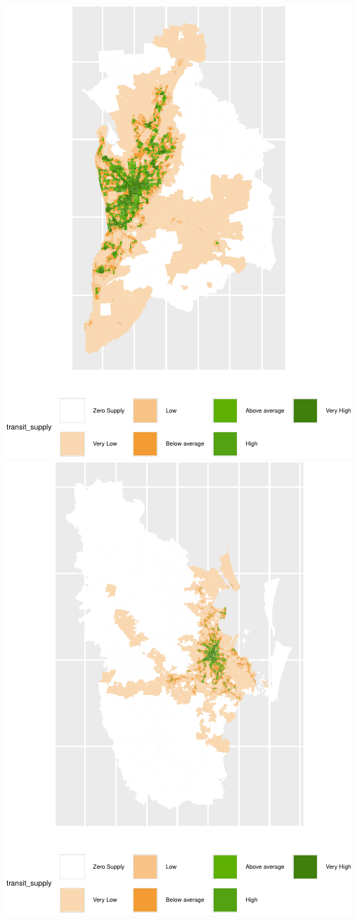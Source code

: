 \documentclass[preprint, 3p,
authoryear]{elsarticle} %
\begin{document}
\includegraphics{Leveraging_GTFS_to_assess_transit_supply_Transport_Geography_files/figure-latex/Australian_cities_2021-2.pdf}
\includegraphics{Leveraging_GTFS_to_assess_transit_supply_Transport_Geography_files/figure-latex/Australian_cities_2021-3.pdf}
\end{document}
